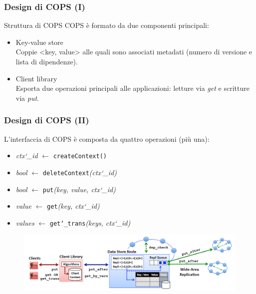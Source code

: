 \begin{frame}
\frametitle{Design di COPS (I)}
\begin{block}{Struttura di COPS}
COPS è formato da due componenti principali:
\begin{itemize}
	\item<1-> Key-value store \\
			  Coppie <key, value> alle quali sono associati metadati (numero di versione
			  e lista di dipendenze).
	\item<1-> Client library \\
			  Esporta due operazioni principali alle applicazioni: letture via \textit{get}
			  e scritture via \textit{put}.
\end{itemize}
\end{block}
\end{frame}

\begin{frame}
\frametitle{Design di COPS (II)}
L'interfaccia di COPS è composta da quattro operazioni (più una):
\begin{itemize}
	\item<1-> \textit{ctx\char`_id} $\leftarrow$ \texttt{createContext()}
	\item<1-> \textit{bool} $\leftarrow$ \texttt{deleteContext}\textit{(ctx\char`_id)}
	\item<1-> \textit{bool} $\leftarrow$ \texttt{put}\textit{(key, value, ctx\char`_id)}
	\item<1-> \textit{value} $\leftarrow$ \texttt{get}\textit{(key, ctx\char`_id)}
	\item<1-> \textit{values} $\leftarrow$ \texttt{get\char`_trans}\textit{(keys, ctx\char`_id)}
\end{itemize}
\begin{figure}
	\centering
	\includegraphics[scale=0.35]{COPS/COPS7.png}
\end{figure}
\end{frame}

